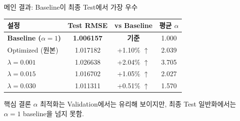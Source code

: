 \documentclass[aspectratio=169,10pt]{beamer}
\begin{document}
\begin{frame}{메인 결과: Baseline이 최종 Test에서 가장 우수}
	\begin{center}
	\renewcommand{\arraystretch}{1.35}
	\begin{tabular}{l|c|c|c}
		\toprule
		\textbf{설정} & \textbf{Test RMSE} & \textbf{vs Baseline} & \textbf{평균 \(\alpha\)} \\
		\midrule
		\rowcolor{testgreen!20}
		\textbf{Baseline (\(\alpha=1\))} & \textbf{1.006157} & \textbf{기준} & 1.000 \\
		Optimized (원본) & 1.017182 & +1.10\% \textcolor{negred}{$\uparrow$} & 2.039 \\
		\(\lambda=0.001\) & 1.026638 & +2.04\% \textcolor{negred}{$\uparrow$} & 3.705 \\
		\(\lambda=0.015\) & 1.016702 & +1.05\% \textcolor{negred}{$\uparrow$} & 2.027 \\
		\(\lambda=0.030\) & 1.011311 & +0.51\% \textcolor{negred}{$\uparrow$} & 1.570 \\
		\bottomrule
	\end{tabular}
	\end{center}

	\vspace{0.5em}
	\begin{alertblock}{핵심 결론}
		\(\alpha\) 최적화는 Validation에서는 유리해 보이지만,
		최종 Test 일반화에서는 \(\alpha=1\) baseline을 넘지 못함.
	\end{alertblock}
\end{frame}
\end{document}
